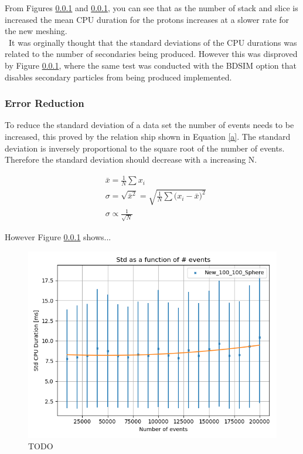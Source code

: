 \documentclass[12pt,a4paper]{article}
\begin{document}
\noindent From Figures \ref{} and \ref{}, you can see that as the number of stack and slice is increased the mean CPU duration for the protons increases at a slower rate for the new meshing. 
\\\
\noindent It was orginally thought that the standard deviations of the CPU durations was related to the number of secondaries being produced. However this was disproved by Figure \ref{}, where the same test was conducted with the BDSIM option that disables secondary particles from being produced implemented.

\subsubsection{Error Reduction}
To reduce the standard deviation of a data set the number of events needs to be increased, this proved by the relation ship shown in Equation \ref{a}.
The standard deviation is inversely proportional to the square root of the number of events. Therefore the standard deviation should decrease with a increasing N.

\begin{equation}
\begin{aligned}
& \bar{x} = \frac{1}{N}\sum{x_i}\\
& \sigma = \sqrt{\bar{x}^2} = \sqrt{\frac{1}{N}\sum{(x_i - \bar{x}})^2}\\
& \sigma \propto \frac{1}{\sqrt{N}} 
\end{aligned}
\label{a}
\end{equation}

However Figure \ref{} shows...\\
\begin{figure}[h!]
\centering
\includegraphics[scale=0.5]{Images//Error//std_N.png}
\caption[width=\columnwidth]{TODO}
\label{fcgvhjbkn}
\end{figure}
\end{document}
